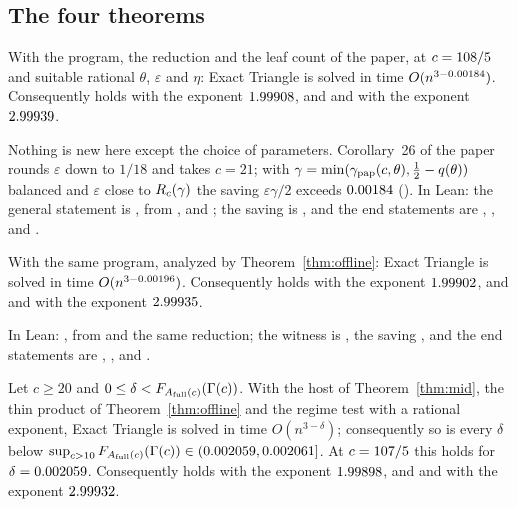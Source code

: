 \subsection{The four theorems}

\begin{theorem}\label{thm:T2}
With the program, the reduction and the leaf count of the paper, at
\(c=108/5\) and suitable rational \(\theta\), \(\varepsilon\) and \(\eta\):
Exact Triangle is solved in time \(O(n^{3-0.00184})\).  Consequently
 holds with the exponent \(1.99908\), and
 and  with the
exponent \(2.99939\).
\end{theorem}

Nothing is new here except the choice of parameters.  Corollary~26 of the paper
rounds \(\varepsilon\) down to \(1/18\) and takes \(c=21\); with
\(\gamma=\min(\gamma_{\mathrm{pap}}(c,\theta),\frac12-q(\theta))\) balanced and
\(\varepsilon\) close to \(R_{c}(\gamma)\) the saving
\(\varepsilon\gamma/2\) exceeds \(0.00184\) ().  In Lean: the general
statement is , from ,
 and ; the saving is
, and the end statements are
, ,  and
.

\begin{theorem}\label{thm:T3}
With the same program, analyzed by Theorem~\ref{thm:offline}: Exact Triangle is
solved in time \(O(n^{3-0.00196})\).  Consequently
 holds with the exponent \(1.99902\), and
 and  with the
exponent \(2.99935\).
\end{theorem}

In Lean: , from  and the same
reduction; the witness is , the saving
, and the end statements are
, ,  and
.

\begin{theorem}\label{thm:T4}
Let \(c\ge20\) and \(0\le\delta<F_{A_{\mathrm{full}}(c)}(\Gamma(c))\).  With the host of
Theorem~\ref{thm:mid}, the thin product of Theorem~\ref{thm:offline} and the
regime test with a rational exponent, Exact Triangle is solved in time
\(O(n^{3-\delta})\); consequently so is every \(\delta\) below
\(\sup_{c>10}F_{A_{\mathrm{full}}(c)}(\Gamma(c))\in(0.002059,0.002061]\).  At
\(c=107/5\) this holds for \(\delta=0.002059\).  Consequently
 holds with the exponent \(1.99898\), and
 and  with the
exponent \(2.99932\).
\end{theorem}

